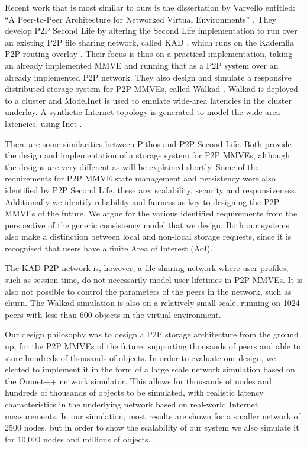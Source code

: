 Recent work that is most similar to ours is the dissertation by Varvello entitled: ``A Peer-to-Peer Architecture for Networked Virtual Environments'' \cite{varvello_phd}. They develop P2P Second Life by altering the Second Life implementation to run over an existing P2P file sharing network, called KAD \cite{KAD_Steiner}, which runs on the Kademlia P2P routing overlay \cite{Kademlia_Maymounkov}. Their focus is thus on a practical implementation, taking an already implemented MMVE and running that as a P2P system over an already implemented P2P network. They also design and simulate a responsive distributed storage system for P2P MMVEs, called Walkad \cite{Walkad_Varvello}. Walkad is deployed to a cluster and ModelInet \cite{ModelInet_Vahdat} is used to emulate wide-area latencies in the cluster underlay. A synthetic Internet topology is generated to model the wide-area latencies, using Inet \cite{Inet_warwick_jamin}.

There are some similarities between Pithos and P2P Second Life. Both provide the design and implementation of a storage system for P2P MMVEs, although the designs are very different as will be explained shortly. Some of the requirements for P2P MMVE state management and persistency were also identified by P2P Second Life, these are: scalability, security and responsiveness. Additionally we identify reliability and fairness as key to designing the P2P MMVEs of the future. We argue for the various identified requirements from the perspective of the generic consistency model that we design. Both our systems also make a distinction between local and non-local storage requests, since it is recognised that users have a finite Area of Interest (AoI).

The KAD P2P network is, however, a file sharing network where user profiles, such as session time, do not necessarily model user lifetimes in P2P MMVEs. It is also not possible to control the parameters of the peers in the network, such as churn. The Walkad simulation is also on a relatively small scale, running on 1024 peers with less than 600 objects in the virtual environment.

Our design philosophy was to design a P2P storage architecture from the ground up, for the P2P MMVEs of the future, supporting thousands of peers and able to store hundreds of thousands of objects. In order to evaluate our design, we elected to implement it in the form of a large scale network simulation based on the Omnet++ network simulator. This allows for thousands of nodes and hundreds of thousands of objects to be simulated, with realistic latency characteristics in the underlying network based on real-world Internet measurements. In our simulation, most results are shown for a smaller network of 2500 nodes, but in order to show the scalability of our system we also simulate it for 10,000 nodes and millions of objects.

